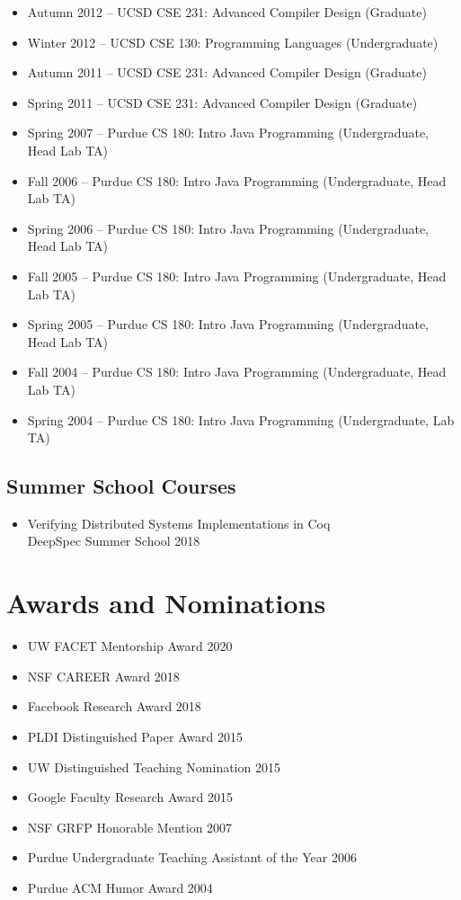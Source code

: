 \documentclass[10pt]{article}
\begin{document}
\begin{itemize}
  \item Autumn 2012 -- UCSD CSE 231: Advanced Compiler Design (Graduate)
  \item Winter 2012 -- UCSD CSE 130: Programming Languages (Undergraduate)
  \item Autumn 2011 -- UCSD CSE 231: Advanced Compiler Design (Graduate)
  \item Spring 2011 -- UCSD CSE 231: Advanced Compiler Design (Graduate)
  \item Spring 2007 -- Purdue CS 180: Intro Java Programming (Undergraduate, Head Lab TA)
  \item Fall 2006 -- Purdue CS 180: Intro Java Programming (Undergraduate, Head Lab TA)
  \item Spring 2006 -- Purdue CS 180: Intro Java Programming (Undergraduate, Head Lab TA)
  \item Fall 2005 -- Purdue CS 180: Intro Java Programming (Undergraduate, Head Lab TA)
  \item Spring 2005 -- Purdue CS 180: Intro Java Programming (Undergraduate, Head Lab TA)
  \item Fall 2004 -- Purdue CS 180: Intro Java Programming (Undergraduate, Head Lab TA)
  \item Spring 2004 -- Purdue CS 180: Intro Java Programming (Undergraduate, Lab TA)
\end{itemize}

\subsection*{Summer School Courses}

\begin{itemize}
  \item Verifying Distributed Systems Implementations in Coq \\
        DeepSpec Summer School 2018
\end{itemize}


\section*{Awards and Nominations}

\begin{itemize}
  \item UW FACET Mentorship Award 2020
  \item NSF CAREER Award 2018
  \item Facebook Research Award 2018
  \item PLDI Distinguished Paper Award 2015
  \item UW Distinguished Teaching Nomination 2015
  \item Google Faculty Research Award 2015
  \item NSF GRFP Honorable Mention 2007
  \item Purdue Undergraduate Teaching Assistant of the Year 2006
  \item Purdue ACM Humor Award 2004
\end{itemize}
\end{document}
